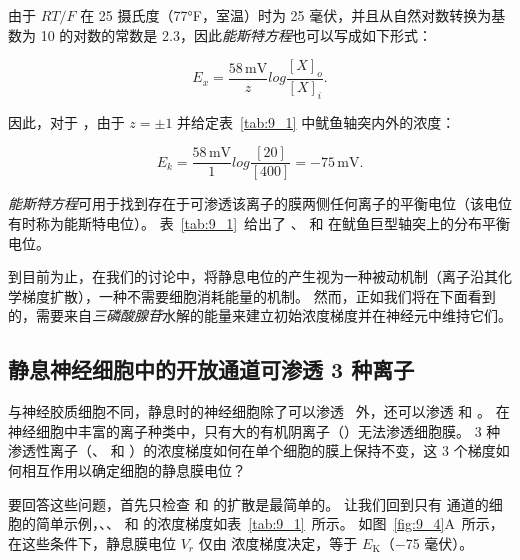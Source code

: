 由于 $RT/F$ 在 25 摄氏度（77°F，室温）时为 25 毫伏，并且从自然对数转换为基数为 10 的对数的常数是 2.3，因此\textit{能斯特方程}也可以写成如下形式：

\begin{equation}\label{eq:9_Nernst_Equation_58}
	E_x = \frac{58 \, \text{mV}}{z} 
			log \frac{[X]_o}{[X]_i}.
\end{equation}


因此，对于 ，由于 $ z = \pm 1 $ 并给定表~\ref{tab:9_1} 中鱿鱼轴突内外的浓度：

\begin{equation}\label{eq:9_axon_concentrations}
	E_k = \frac{58 \, \text{mV}}{1} 
			log \frac{[20]}{[400]}
			= -75 \, \text{mV}.
\end{equation}


\textit{能斯特方程}可用于找到存在于可渗透该离子的膜两侧任何离子的平衡电位（该电位有时称为能斯特电位）。
表~\ref{tab:9_1}~给出了 、 和  在鱿鱼巨型轴突上的分布平衡电位。


到目前为止，在我们的讨论中，将静息电位的产生视为一种被动机制（离子沿其化学梯度扩散），一种不需要细胞消耗能量的机制。
然而，正如我们将在下面看到的，需要来自\textit{三磷酸腺苷}水解的能量来建立初始浓度梯度并在神经元中维持它们。



\subsection{静息神经细胞中的开放通道可渗透 3 种离子}

与神经胶质细胞不同，静息时的神经细胞除了可以渗透~ 外，还可以渗透  和 。
在神经细胞中丰富的离子种类中，只有大的有机阴离子（）无法渗透细胞膜。
3 种渗透性离子（、 和 ）的浓度梯度如何在单个细胞的膜上保持不变，这 3 个梯度如何相互作用以确定细胞的静息膜电位？


要回答这些问题，首先只检查  和  的扩散是最简单的。
让我们回到只有  通道的细胞的简单示例，、、 和  的浓度梯度如表~\ref{tab:9_1}~所示。
如图~\ref{fig:9_4}A~所示，在这些条件下，静息膜电位 $V_r$ 仅由  浓度梯度决定，等于 $E_\text{K}$（−75 毫伏）。



